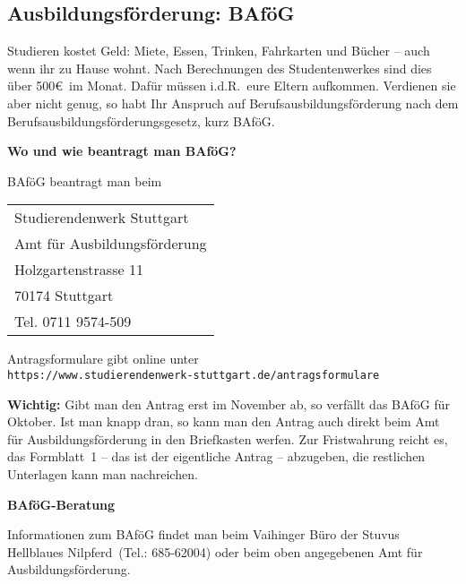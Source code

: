 \subsection{Ausbildungsförderung: BAföG}

Studieren kostet Geld: Miete, Essen, Trinken, Fahrkarten und Bücher --
auch wenn ihr zu Hause wohnt.
Nach Berechnungen des Studentenwerkes sind dies über 500\euro\ im Monat.
Dafür müssen i.d.R.\ eure Eltern aufkommen.
Verdienen sie aber nicht genug,
so habt Ihr Anspruch auf Berufsausbildungsförderung
nach dem Berufsausbildungsförderungsgesetz, kurz BAföG.

{\large \bf Wo und wie beantragt man BAföG?}

BAföG beantragt man beim

\begin{center}\begin{tabular}{|ll|}\hline
\multicolumn{2}{|l|}{Studierendenwerk Stuttgart}\\
\multicolumn{2}{|l|}{Amt für Ausbildungsförderung}\\
Holzgartenstrasse 11   & \\
70174 Stuttgart  & \\
\multicolumn{2}{|l|}{Tel. 0711 9574-509}\\\hline
\end{tabular}\end{center}

Antragsformulare gibt online unter\\
 \verb|https://www.studierendenwerk-stuttgart.de/antragsformulare| 

{\bf Wichtig:}
Gibt man den Antrag erst im November ab,
so verfällt das BAföG für Oktober.
Ist man knapp dran, so kann man den Antrag auch direkt
beim Amt für Ausbildungsförderung in den Briefkasten werfen.
Zur Fristwahrung reicht es, das Formblatt~1 --
das ist der eigentliche Antrag -- abzugeben,
die restlichen Unterlagen kann man nachreichen.


\newpage
{\large \bf BAföG-Beratung}

Informationen zum BAföG findet man beim Vaihinger Büro der Stuvus
\glqq Hellblaues Nilpferd\grqq~(Tel.: 685-62004)
oder beim oben angegebenen Amt für Ausbildungsförderung.

